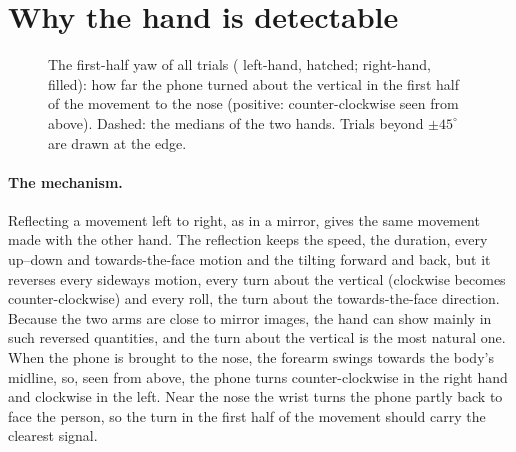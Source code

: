 \section{Why the hand is detectable}\label{sec:physics}

\begin{figure}[tbp]
\centering
\begin{minipage}[t]{0.49\linewidth}\centering
  \caption{The average movement to the nose with each hand (left: red, dashed; right: blue, solid): each
  participant's mean curve, averaged over the  participants (band: $\pm 1$ standard error).
  Time runs from the start of the movement (0\,\%) to the arrival at the nose (100\,\%). Top: tilting speed; middle:
  yaw rate (turning speed about the vertical); bottom: the yaw, with the first half of the movement shaded.}
  \label{fig:means}
\end{minipage}\hfill
\begin{minipage}[t]{0.49\linewidth}\centering
  \caption{The first-half yaw of all  trials ( left-hand,
  hatched;  right-hand, filled): how far the phone turned about the vertical in the first
  half of the movement to the nose (positive: counter-clockwise seen from above). Dashed: the medians of the two
  hands. Trials beyond $\pm 45^\circ$ are drawn at the edge.}
  \label{fig:fhy}
\end{minipage}
\end{figure}

\paragraph{The mechanism.} Reflecting a movement left to right, as in a mirror, gives the same movement made with the
other hand. The reflection keeps the speed, the duration, every up--down and towards-the-face motion and the tilting
forward and back, but it reverses every sideways motion, every turn about the vertical (clockwise becomes
counter-clockwise) and every roll, the turn about the towards-the-face direction. Because the two arms are close to
mirror images, the hand can show mainly in such reversed quantities, and the turn about the vertical is the most
natural one. When the phone is brought to the nose, the forearm swings towards the body's midline, so, seen from
above, the phone turns counter-clockwise in the right hand and clockwise in the left. Near the nose the wrist turns the
phone partly back to face the person, so the turn in the first half of the movement should carry the clearest signal.

